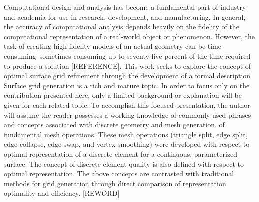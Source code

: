 Computational design and analysis has become a fundamental part of industry and
academia for use in research, development, and manufacturing. In general, the
accuracy of computational analysis depends heavily on the fidelity of the
computational representation of a real-world object or phenomenon. However, the
task of creating high fidelity models of an actual geometry can be
time-consuming--sometimes consuming up to seventy-five percent of the time
required to produce a solution [REFERENCE]. This work seeks to explore the
concept of optimal surface grid refinement through the development of a formal
description Surface grid generation is a rich and mature topic.  In order to
focus only on the contribution presented here, only a limited background or
explanation will be given for each related topic.  To accomplish this focused
presentation, the author will assume the reader possesses a working knowledge
of commonly used phrases and concepts associated with discrete geometry and
mesh generation.  of fundamental mesh operations. These mesh operations
(triangle split, edge split, edge collapse, edge swap, and vertex smoothing)
were developed with respect to optimal representation of a discrete element
for a continuous, parameterized surface. The concept of discrete element
quality is also defined with respect to optimal representation. The above
concepts are contrasted with traditional methods for grid generation through
direct comparison of representation optimality and efficiency.
[REWORD]
